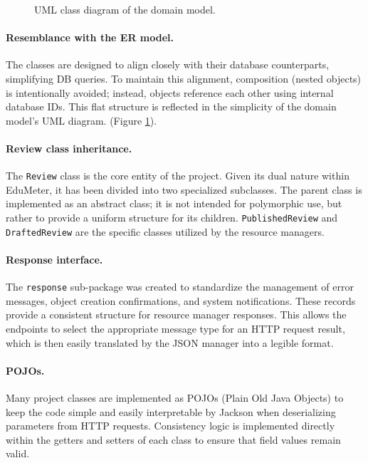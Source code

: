 \begin{figure}[H]
	\caption{UML class diagram of the domain model.}
	\label{UML-domain-model}
\end{figure}

\paragraph{\textbf{Resemblance with the ER model.}} The classes are designed to align closely with their database counterparts, simplifying DB queries. To maintain this alignment, composition (nested objects) is intentionally avoided; instead, objects reference each other using internal database IDs. This flat structure is reflected in the simplicity of the domain model's UML diagram. (Figure \ref{UML-domain-model}).

\paragraph{\textbf{Review class inheritance.}} The \texttt{Review} class is the core entity of the project. Given its dual nature within EduMeter, it has been divided into two specialized subclasses. The parent class is implemented as an abstract class; it is not intended for polymorphic use, but rather to provide a uniform structure for its children. \texttt{PublishedReview} and \texttt{DraftedReview} are the specific classes utilized by the resource managers.

\paragraph{\textbf{Response interface.}} The \texttt{response} sub-package was created to standardize the management of error messages, object creation confirmations, and system notifications. These records provide a consistent structure for resource manager responses. This allows the endpoints to select the appropriate message type for an HTTP request result, which is then easily translated by the JSON manager into a legible format.

\paragraph{\textbf{POJOs.}} Many project classes are implemented as POJOs (Plain Old Java Objects) to keep the code simple and easily interpretable by Jackson when deserializing parameters from HTTP requests. Consistency logic is implemented directly within the getters and setters of each class to ensure that field values remain valid.

